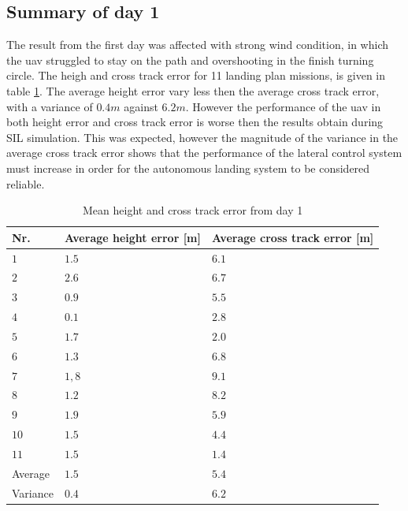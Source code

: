\subsection{Summary of day 1}\label{sss:summaryDay1}
The result from the first day was affected with strong wind condition, in which the \gls{uav} struggled to stay on the path and overshooting in the finish turning circle. The heigh and cross track error for 11 landing plan missions, is given in table \ref{tb:Day1HeightCrossTrack}. The average height error vary less then the average cross track error, with a variance of $0.4 m$ against $6.2 m$. However the performance of the \gls{uav} in both height error and cross track error is worse then the results obtain during SIL simulation. This was expected, however the magnitude of the variance in the average cross track error shows that the performance of the lateral control system must increase in order for the autonomous landing system to be considered reliable.
\begin{table}[H]
\centering
\begin{tabular}{| l | l | l |}
\hline
\textbf{Nr.} 	& \textbf{Average height error [m]} 	& \textbf{Average cross track error [m]}  \\ \hline
$1$				& $1.5$							& $6.1$								\\ \hline
$2$				& $2.6$							& $6.7$								\\ \hline
$3$				& $0.9$							& $5.5$								\\ \hline
$4$				& $0.1$							& $2.8$								\\ \hline
$5$				& $1.7$							& $2.0$								\\ \hline
$6$				& $1.3$							& $6.8$								\\ \hline
$7$				& $1,8$							& $9.1$								\\ \hline
$8$				& $1.2$							& $8.2$								\\ \hline
$9$				& $1.9$							& $5.9$								\\ \hline
$10$			& $1.5$							& $4.4$								\\ \hline
$11$			& $1.5$							& $1.4$								\\ \hline
Average			& $1.5$							& $5.4$								\\ \hline
Variance		& $0.4$							& $6.2$								\\ \hline
\end{tabular}
\caption{Mean height and cross track error from day 1}
\label{tb:Day1HeightCrossTrack}
\end{table}
